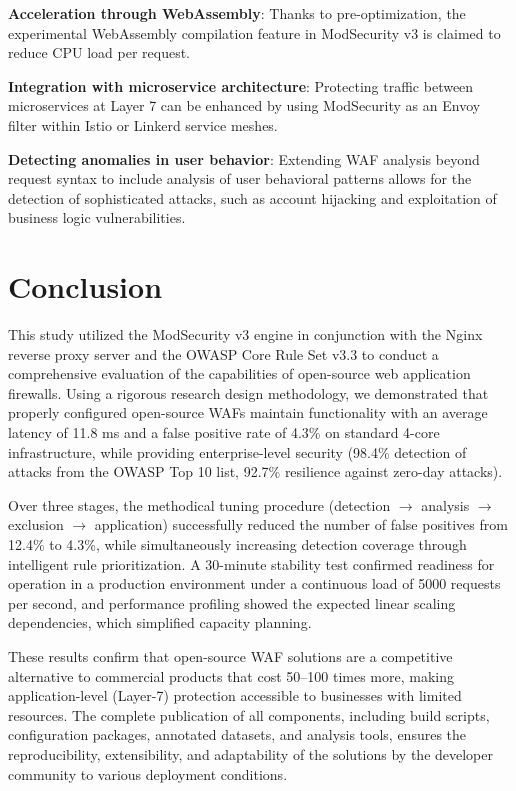 \documentclass[10pt,conference]{IEEEtran}
\begin{document}
\textbf{Acceleration through WebAssembly}: Thanks to pre-optimization, the experimental WebAssembly compilation feature in ModSecurity v3 is claimed to reduce CPU load per request.

\textbf{Integration with microservice architecture}: Protecting traffic between microservices at Layer 7 can be enhanced by using ModSecurity as an Envoy filter within Istio or Linkerd service meshes.

\textbf{Detecting anomalies in user behavior}: Extending WAF analysis beyond request syntax to include analysis of user behavioral patterns allows for the detection of sophisticated attacks, such as account hijacking and exploitation of business logic vulnerabilities.

\section{Conclusion}

This study utilized the ModSecurity v3 engine in conjunction with the Nginx reverse proxy server and the OWASP Core Rule Set v3.3 to conduct a comprehensive evaluation of the capabilities of open-source web application firewalls. Using a rigorous research design methodology, we demonstrated that properly configured open-source WAFs maintain functionality with an average latency of 11.8 ms and a false positive rate of 4.3\% on standard 4-core infrastructure, while providing enterprise-level security (98.4\% detection of attacks from the OWASP Top 10 list, 92.7\% resilience against zero-day attacks).

Over three stages, the methodical tuning procedure (detection $\rightarrow$ analysis $\rightarrow$ exclusion $\rightarrow$ application) successfully reduced the number of false positives from 12.4\% to 4.3\%, while simultaneously increasing detection coverage through intelligent rule prioritization. A 30-minute stability test confirmed readiness for operation in a production environment under a continuous load of 5000 requests per second, and performance profiling showed the expected linear scaling dependencies, which simplified capacity planning.

These results confirm that open-source WAF solutions are a competitive alternative to commercial products that cost 50–100 times more, making application-level (Layer-7) protection accessible to businesses with limited resources. The complete publication of all components, including build scripts, configuration packages, annotated datasets, and analysis tools, ensures the reproducibility, extensibility, and adaptability of the solutions by the developer community to various deployment conditions.
\end{document}
